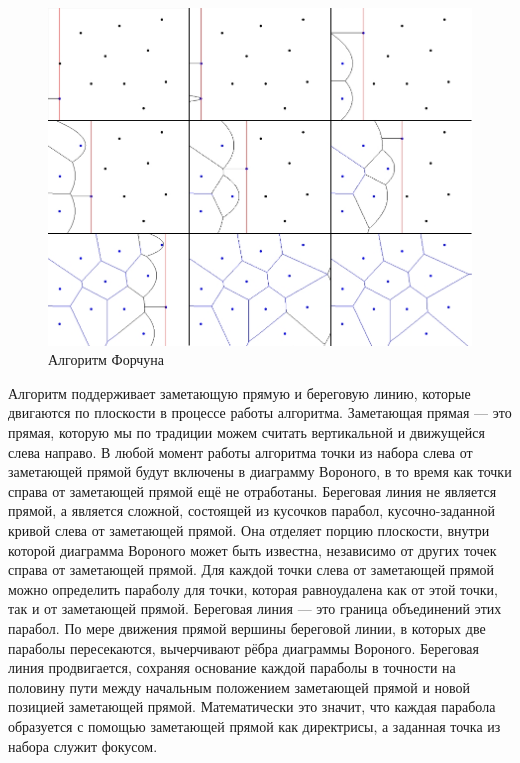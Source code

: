 \begin{figure}[H]
    \centering
    \includegraphics[width=1\linewidth]{fortunes-algo.jpg}
    \caption{Алгоритм Форчуна}
\end{figure}

Алгоритм поддерживает заметающую прямую и береговую линию, которые двигаются по плоскости в процессе работы алгоритма. Заметающая прямая — это прямая, которую мы по традиции можем считать вертикальной и движущейся слева направо. В любой момент работы алгоритма точки из набора слева от заметающей прямой будут включены в диаграмму Вороного, в то время как точки справа от заметающей прямой ещё не отработаны. Береговая линия не является прямой, а является сложной, состоящей из кусочков парабол, кусочно-заданной кривой слева от заметающей прямой. Она отделяет порцию плоскости, внутри которой диаграмма Вороного может быть известна, независимо от других точек справа от заметающей прямой. Для каждой точки слева от заметающей прямой можно определить параболу для точки, которая равноудалена как от этой точки, так и от заметающей прямой. Береговая линия — это граница объединений этих парабол. По мере движения прямой вершины береговой линии, в которых две параболы пересекаются, вычерчивают рёбра диаграммы Вороного. Береговая линия продвигается, сохраняя основание каждой параболы в точности на половину пути между начальным положением заметающей прямой и новой позицией заметающей прямой. Математически это значит, что каждая парабола образуется с помощью заметающей прямой как директрисы, а заданная точка из набора служит фокусом.

